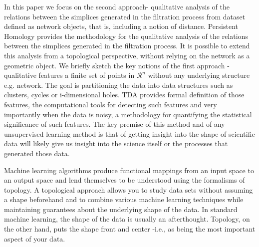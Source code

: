 \documentclass[onecollarge,runningheads]{svjour2}
\begin{document}
In this paper we focus on the second approach- qualitative analysis of the relations between the simplices generated in the filtration process from dataset defined as network objects, that is, including a notion of distance. Persistent Homology provides the methodology for the qualitative analysis of the relations between the simplices generated in the filtration process. It is possible to extend this analysis from a topological perspective, without relying on the network as a geometric object.
We briefly sketch the key notions of the first approach -qualitative features a finite set of points in $\mathcal{R}^n$ without any underlying structure e.g. network.
The goal is partitioning the data into data structures such as clusters, cycles or i-dimensional holes. TDA provides formal definition of those features, the computational tools for detecting such features and very importantly when the data is noisy, a methodology for quantifying the statistical significance of such features. 
The key premise of this method and of any unsupervised learning method is that of getting insight into the shape of scientific data will likely give us insight into the science itself or the processes that generated those data.

Machine learning algorithms produce functional mappings from an input space to an output space and lend themselves to be understood using the formalisms of topology. A topological approach allows you to study data sets without assuming a shape beforehand and to combine various machine learning techniques while maintaining guarantees about the underlying shape of the data. In standard machine learning, the shape of the data is usually an afterthought. Topology, on the other hand, puts the shape front and center  -i.e., as being the most important aspect of your data.

\end{document}
